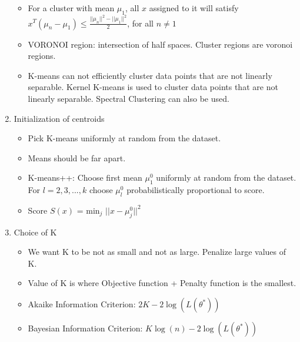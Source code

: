 \documentclass[a4paper]{article}
\begin{document}
\begin{enumerate}
    \begin{itemize}
        \item For a cluster with mean $\mu_1$, all $x$ assigned to it will satisfy $x^T(\mu_n - \mu_1) \leq \frac{||\mu_n||^2 - ||\mu_1||^2}{2}$, for all $n\neq 1$
        \item VORONOI region: intersection of half spaces. Cluster regions are voronoi regions.
        \item K-means can not efficiently cluster data points that are not linearly separable. Kernel K-means is used to cluster data points that are not linearly separable. Spectral Clustering can also be used.
    \end{itemize}
    \item Initialization of centroids
    \begin{itemize}
        \item Pick K-means uniformly at random from the dataset.
        \item Means should be far apart.
        \item K-means++: Choose first mean $\mu^0_1$ uniformly at random from the dataset. For $l=2,3,...,k$ choose $\mu_l^0$ probabilistically proportional to score.
        \item Score $S(x)$ = min$_j$ $||x-\mu_j^0||^2$
    \end{itemize}
    \item Choice of K
    \begin{itemize}
        \item We want K to be not as small and not as large. Penalize large values of K.
        \item Value of K is where Objective function + Penalty function is the smallest.
        \item Akaike Information Criterion: $2K-2\log(L(\theta^*))$
        \item Bayesian Information Criterion: $K\log(n)-2\log(L(\theta^*))$
    \end{itemize}
\end{enumerate}
\end{document}
